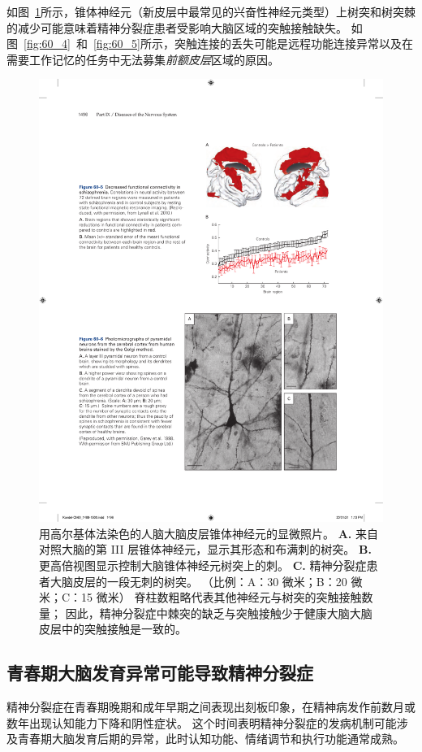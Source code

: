 如图~\ref{fig:60_6}所示，锥体神经元（新皮层中最常见的兴奋性神经元类型）上树突和树突棘的减少可能意味着精神分裂症患者受影响大脑区域的突触接触缺失。
如图~\ref{fig:60_4}~和~\ref{fig:60_5}所示，突触连接的丢失可能是远程功能连接异常以及在需要工作记忆的任务中无法募集\textit{前额皮层}区域的原因。


\begin{figure}[htbp]
	\centering
	\includegraphics[width=0.7\linewidth]{chap60/fig_60_6}
	\caption{用高尔基体法染色的人脑大脑皮层锥体神经元的显微照片。
		\textbf{A.} 来自对照大脑的第 III 层锥体神经元，显示其形态和布满刺的树突。
		\textbf{B.} 更高倍视图显示控制大脑锥体神经元树突上的刺。
		\textbf{C.} 精神分裂症患者大脑皮层的一段无刺的树突。 （比例：A：30 微米；B：20 微米；C：15 微米）
		脊柱数粗略代表其他神经元与树突的突触接触数量；
		因此，精神分裂症中棘突的缺乏与突触接触少于健康大脑大脑皮层中的突触接触是一致的\cite{garey1998reduced}。}
	\label{fig:60_6}
\end{figure}



\subsection{青春期大脑发育异常可能导致精神分裂症}

精神分裂症在青春期晚期和成年早期之间表现出刻板印象，在精神病发作前数月或数年出现认知能力下降和阴性症状。
这个时间表明精神分裂症的发病机制可能涉及青春期大脑发育后期的异常，此时认知功能、情绪调节和执行功能通常成熟。



